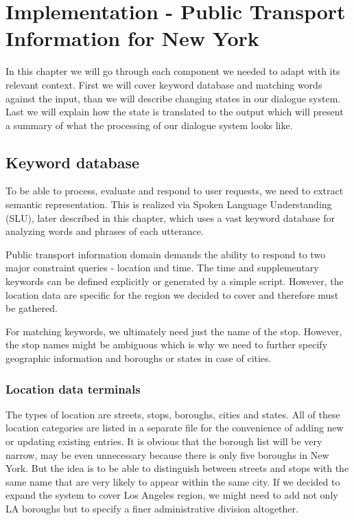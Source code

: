 \chapter{Implementation - Public Transport Information for New York}

In this chapter we will go through each component we needed to adapt with its relevant context.
First we will cover keyword database and matching words against the input, than we will describe changing states in our dialogue system.
Last we will explain how the state is translated to the output which will present a summary of what the processing of our dialogue system looks like.

\section{Keyword database} 

To be able to process, evaluate and respond to user requests, we need to extract semantic representation.
This is realized via Spoken Language Understanding (SLU), later described in this chapter, which uses a vast keyword database for analyzing words and phrases of each utterance.

Public transport information domain demands the ability to respond to two major constraint queries - location and time.
The time and supplementary keywords can be defined explicitly or generated by a simple script.
However, the location data are specific for the region we decided to cover and therefore must be gathered.

For matching keywords, we ultimately need just the name of the stop. 
However, the stop names might be ambiguous which is why we need to further specify geographic information and boroughs or states in case of cities. 

\subsection{Location data terminals} \label{sec:terminals}

The types of location are streets, stops, boroughs, cities and states.
All of these location categories are listed in a separate file for the convenience of adding new or updating existing entries.
It is obvious that the borough list will be very narrow, may be even unnecessary because there is only five boroughs in New York.
But the idea is to be able to distinguish between streets and stops with the same name that are very likely to appear within the same city.
If we decided to expand the system to cover Los Angeles region, we might need to add not only LA boroughs but to specify a finer administrative division altogether.

